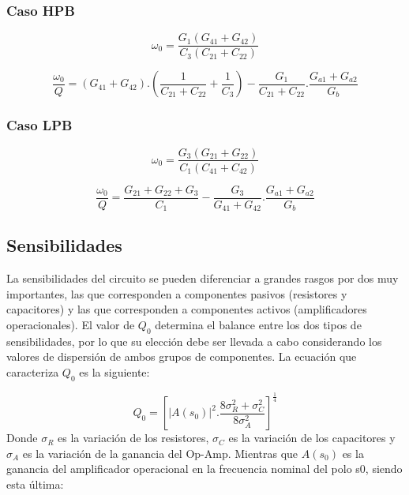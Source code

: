\subsubsection*{Caso HPB}

\begin{equation}
\omega_0 = \frac{G_1 ( G_{41} + G_{42} )}{C_3 ( C_{21} + C_{22} ) }
\label{w0 HPB}
\end{equation}

\begin{equation}
\frac{\omega_0}{Q} = (G_{41}+G_{42}). \left( \frac{1}{C_{21} + C_{22}} + \frac{1}{C_3} \right) - \frac{G_1}{C_{21} + C_{22}} . \frac{G_{a1}+G_{a2}}{G_b}
\label{w/Q HPB}
\end{equation}

\subsubsection*{Caso LPB}

\begin{equation}
\omega_0 = \frac{G_3 ( G_{21} + G_{22} )}{C_1 ( C_{41} + C_{42} ) }
\label{w0 LPB}
\end{equation}

\begin{equation}
\frac{\omega_0}{Q} = \frac{G_{21} + G_{22} + G_3}{C_1} - \frac{G_3}{G_{41}+G_{42}} . \frac{G_{a1}+G_{a2}}{G_b}
\label{w/Q LPB}
\end{equation}

\subsection{Sensibilidades}

La sensibilidades del circuito se pueden diferenciar a grandes rasgos por dos muy importantes, las que corresponden a componentes pasivos (resistores y capacitores) y las que corresponden a componentes activos (amplificadores operacionales). El valor de $Q_0$ determina el balance entre los dos tipos de sensibilidades, por lo que su elección debe ser llevada a cabo considerando los valores de dispersión de ambos grupos de componentes. La ecuación que caracteriza $Q_0$ es la siguiente:

\begin{equation}
Q_0 = \left[ |A(s_0)| ^2 . \frac{8\sigma_R^2 + \sigma_C^2}{8\sigma
_A^2} \right] ^\frac{1}{4}
\label{eq Q0}
\end{equation}
Donde $\sigma_R$ es la variación de los resistores, $\sigma_C$ es la variación de los capacitores y $\sigma_A$ es la variación de la ganancia del Op-Amp. Mientras que $A(s_0)$ es la ganancia del amplificador operacional en la frecuencia nominal del polo s0, siendo esta
última:

